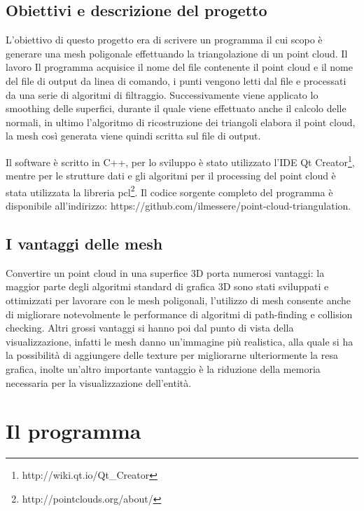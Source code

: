 \documentclass[a4paper,12pt]{article}
\begin{document}
	\subsection{Obiettivi e descrizione del progetto}
	L'obiettivo di questo progetto era di scrivere un programma il cui scopo è generare una mesh poligonale effettuando la
	triangolazione di un point cloud. Il lavoro 
	Il programma acquisice il nome del file contenente il point cloud e il nome del file di output da linea di comando,
	i punti vengono letti dal file e processati da una serie di algoritmi di filtraggio. 
	Successivamente viene applicato lo smoothing delle superfici, durante il quale viene effettuato anche il calcolo delle
	normali, in ultimo l'algoritmo di ricostruzione dei triangoli elabora il point cloud, la mesh così generata viene quindi
	scritta sul file di output.  
	
	Il software è scritto in C++, per lo sviluppo è stato utilizzato l'IDE Qt Creator\footnote{http://wiki.qt.io/Qt\_Creator},
	mentre per le strutture dati e gli algoritmi per il processing del point cloud è stata utilizzata la libreria
	pcl\footnote{http://pointclouds.org/about/}.	
	Il codice sorgente completo del programma è disponibile all'indirizzo: 
	https://github.com/ilmessere/point-cloud-triangulation.
	   	
	\subsection{I vantaggi delle mesh}
	Convertire un point cloud in una superfice 3D porta numerosi vantaggi: la maggior parte degli algoritmi standard di grafica
	3D sono stati sviluppati e ottimizzati per lavorare con le mesh poligonali, l'utilizzo di mesh consente anche di migliorare 
	notevolmente le performance di algoritmi di path-finding e collision checking. Altri grossi vantaggi si hanno poi dal punto
	di vista della visualizzazione, infatti le mesh danno un'immagine più realistica, alla quale si ha la possibilità di
	aggiungere delle texture per migliorarne ulteriormente la resa grafica, inolte un'altro importante vantaggio è la riduzione
	della memoria necessaria per la visualizzazione dell'entità. 
	
\clearpage
\section{Il programma}
\end{document}

